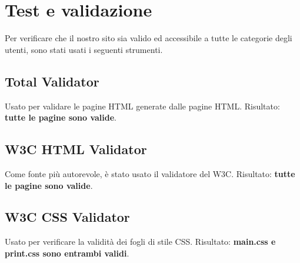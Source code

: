 \documentclass[1_relazione.tex]{subfiles}
\begin{document}
    \section{Test e validazione}\label{sec:test-e-validazione}
    Per verificare che il nostro sito sia valido ed accessibile a tutte le categorie degli utenti, sono stati usati i seguenti strumenti.

    \subsection{Total Validator}
    Usato per validare le pagine HTML generate dalle pagine HTML.\newline
    Risultato: \textbf{tutte le pagine sono valide}.
    \subsection{W3C HTML Validator}
    Come fonte pi\`{u} autorevole, \`{e} stato usato il validatore del W3C.\newline
    Risultato: \textbf{tutte le pagine sono valide}.
    \subsection{W3C CSS Validator}
    Usato per verificare la validit\`{a} dei fogli di stile CSS. \newline
    Risultato: \textbf{main.css e print.css sono entrambi validi}.
\end{document}
